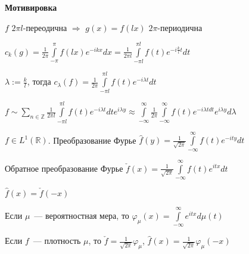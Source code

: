 {\bf Мотивировка}


$f$ $2\pi l$-переодична $\Rightarrow$ $g(x) = f(lx)$ $2\pi$-периодична

$c_k(g) = \frac{1}{2\pi}\int\limits_{-\pi}^{\pi} f(lx)e^{-ikx}dx = \frac{1}{2\pi l} \int\limits_{-\pi l}^{\pi l} f(t) e^{-i\frac{k}{l}t}dt$

$\lambda := \frac{k}{l}$, тогда $c_\lambda(f) = \frac{1}{2\pi} \int\limits_{-\pi l}^{\pi l} f(t) e^{-i\lambda t}dt$

$f\sim \sum\limits_{n \in \mathbb{Z}} \frac{1}{2\pi l} \int\limits_{-\pi l}^{\pi l} f(t) e^{-i\lambda t}dt e^{i\lambda y} \approx \int\limits_{-\infty}^{\infty} \frac{1}{2\pi} \int\limits_{-\infty}^{\infty} f(t) e^{-i\lambda tdt} e^{i\lambda y} d\lambda$

\begin{definition}
    $f \in L^1(\mathbb{R})$. Преобразование Фурье $\hat f(y) = \frac{1}{\sqrt{2 \pi}} \int\limits_{-\infty}^{\infty} f(t) e^{-ity} dt$

    Обратное преобразование Фурье $\check f(x) = \frac{1}{\sqrt{2\pi}} \int\limits_{-\infty}^{\infty}f(t)e^{itx}dt$
\end{definition}

\begin{observation}
    $\hat f(x) = \check f(-x)$

    Если $\mu$~--- вероятностная мера, то $\varphi_{\mu}(x)=\int\limits_{-\infty}^{\infty} e^{itx}d\mu(t)$

    Если $f$~--- плотность $\mu$, то $\check f = \frac{1}{\sqrt{2\pi}}\varphi_\mu$, $\hat f(x) = \frac{1}{\sqrt{2\pi}} \varphi_{\mu}(-x)$
\end{observation}

